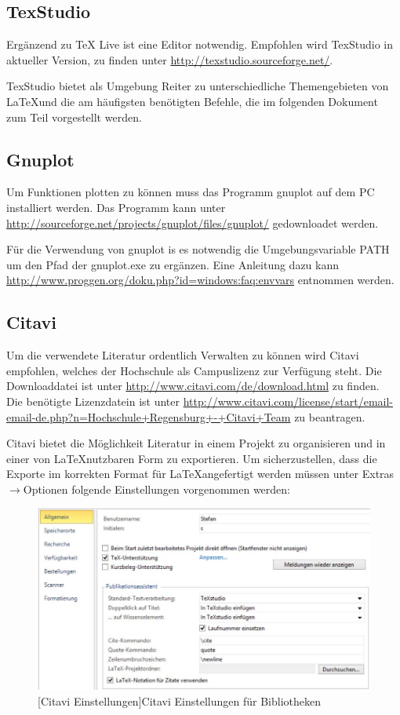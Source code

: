 \documentclass[12pt,a4paper, listof=entryprefix, bibliography=totocnumbered,toc=listofnumbered,lof=listofnumbered]{scrartcl}
\begin{document}
\subsection{TexStudio}
\label{ch:texstudio}
Ergänzend zu TeX Live ist eine Editor notwendig. Empfohlen wird TexStudio in aktueller Version, zu finden unter \url{http://texstudio.sourceforge.net/}.

TexStudio bietet als Umgebung Reiter zu unterschiedliche Themengebieten von \LaTeX und die am häufigsten benötigten Befehle, die im folgenden Dokument zum Teil vorgestellt werden. 

\subsection{Gnuplot}
\label{ch:gnuplot}
Um Funktionen plotten zu können muss das Programm gnuplot auf dem PC installiert werden. Das Programm kann unter \url{http://sourceforge.net/projects/gnuplot/files/gnuplot/} gedownloadet werden. 

Für die Verwendung von gnuplot is es notwendig die Umgebungsvariable PATH um den Pfad der gnuplot.exe zu ergänzen. Eine Anleitung dazu kann \url{http://www.proggen.org/doku.php?id=windows:faq:envvars} entnommen werden.

\subsection{Citavi}
\label{ch:citavi}
Um die verwendete Literatur ordentlich Verwalten zu können wird Citavi empfohlen, welches der Hochschule als Campuslizenz zur Verfügung steht.
Die Downloaddatei ist unter \url{http://www.citavi.com/de/download.html} zu finden.\\
Die benötigte Lizenzdatein ist unter \url{http://www.citavi.com/license/start/email-email-de.php?n=Hochschule+Regensburg+-+Citavi+Team} zu beantragen.

Citavi bietet die Möglichkeit Literatur in einem Projekt zu organisieren und in einer von \LaTeX nutzbaren Form zu exportieren. Um sicherzustellen, dass die Exporte im korrekten Format für \LaTeX angefertigt werden müssen unter Extras$\rightarrow$Optionen folgende Einstellungen vorgenommen werden:

\begin{figure}[H]
	\centering
	\includegraphics[width=0.8\linewidth]{Bilder/citavi.jpg} 
	[Citavi Einstellungen]{Citavi Einstellungen für Bibliotheken}
	\label{fig:citavi}
\end{figure}
\end{document}
